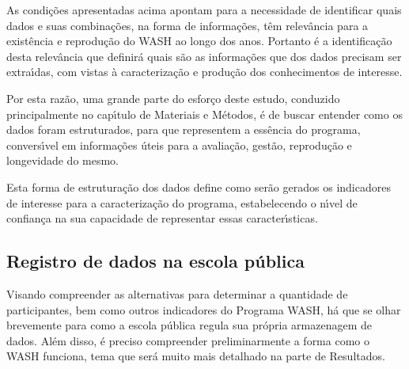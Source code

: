 \documentclass[
12pt,		%
openright,	%
twoside,  %
a4paper,			%
chapter=TITLE,		%
english,			%
french,				%
spanish,			%
brazil				%
]{USPSC-classe/USPSC}
\begin{document}
As condi\c{c}\~oes apresentadas acima apontam para a necessidade de identificar quais dados e suas combina\c{c}\~oes, na forma de informa\c{c}\~oes, t\^em relev\^ancia para a exist\^encia e reprodu\c{c}\~ao do WASH ao longo dos anos. Portanto \'e a identifica\c{c}\~ao desta relev\^ancia que definir\'a quais s\~ao as informa\c{c}\~oes que dos dados precisam ser extra\'{\i}das, com vistas \`a  caracteriza\c{c}\~ao e produ\c{c}\~ao dos conhecimentos de interesse.

















Por esta raz\~ao, uma grande parte do esfor\c{c}o deste estudo, conduzido principalmente no cap\'{\i}tulo de Materiais e M\'etodos, \'e de buscar entender como os dados foram estruturados, para que representem a ess\^encia do programa, convers\'{\i}vel em informa\c{c}\~oes \'uteis para a avalia\c{c}\~ao, gest\~ao, reprodu\c{c}\~ao e longevidade do mesmo.

















Esta forma de estrutura\c{c}\~ao dos dados define como ser\~ao gerados os indicadores de interesse para a caracteriza\c{c}\~ao do programa, estabelecendo o n\'{\i}vel de confian\c{c}a na sua capacidade de representar essas caracter\'{\i}sticas.

















\subsection[Registro de dados na escola p\'ublica]{Registro de dados na escola p\'ublica}\label{Registro de dados na escola p\'ublica}
Visando compreender as alternativas para determinar a quantidade de participantes, bem como outros indicadores do Programa WASH, h\'a que se olhar brevemente para como a escola p\'ublica regula sua pr\'opria armazenagem de dados. Al\'em disso, \'e preciso compreender preliminarmente a forma como o WASH funciona, tema que ser\'a muito mais detalhado na parte de Resultados.
\end{document}
